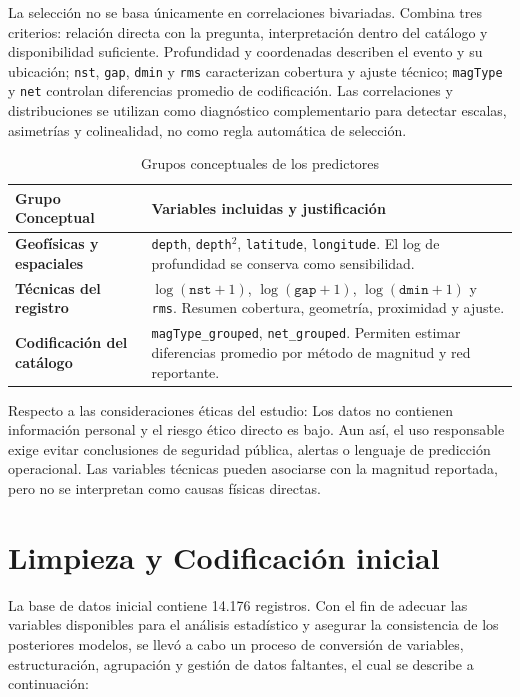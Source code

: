 \documentclass{style}
\newcommand{\var}[1]{\texttt{#1}}
\begin{document}
La selección no se basa únicamente en correlaciones bivariadas. Combina tres criterios: relación directa con la pregunta, interpretación dentro del catálogo y disponibilidad suficiente. Profundidad y coordenadas describen el evento y su ubicación; \var{nst}, \var{gap}, \var{dmin} y \var{rms} caracterizan cobertura y ajuste técnico; \var{magType} y \var{net} controlan diferencias promedio de codificación. Las correlaciones y distribuciones se utilizan como diagnóstico complementario para detectar escalas, asimetrías y colinealidad, no como regla automática de selección.

\begin{table}[H]
    \centering
    \caption{Grupos conceptuales de los predictores}
    \label{tab:grupos_predictores}
    \scriptsize
    \begin{tabularx}{\textwidth}{lX}
    \toprule
    \textbf{Grupo Conceptual} & \textbf{Variables incluidas y justificación} \\
    \midrule
    \textbf{Geofísicas y espaciales} & \var{depth}, \var{depth}$^2$, \var{latitude}, \var{longitude}. El log de profundidad se conserva como sensibilidad. \\
    \textbf{Técnicas del registro} & $\log(\var{nst}+1)$, $\log(\var{gap}+1)$, $\log(\var{dmin}+1)$ y \var{rms}. Resumen cobertura, geometría, proximidad y ajuste. \\
    \textbf{Codificación del catálogo} & \var{magType\_grouped}, \var{net\_grouped}. Permiten estimar diferencias promedio por método de magnitud y red reportante. \\
    \bottomrule
    \end{tabularx}
\end{table}


Respecto a las consideraciones éticas del estudio: Los datos no contienen información personal y el riesgo ético directo es bajo. Aun así, el uso responsable exige evitar conclusiones de seguridad pública, alertas o lenguaje de predicción operacional. Las variables técnicas pueden asociarse con la magnitud reportada, pero no se interpretan como causas físicas directas.

\section{Limpieza y Codificación inicial }

La base de datos inicial contiene 14.176 registros. Con el fin de adecuar las variables disponibles para el análisis estadístico y asegurar la consistencia de los posteriores modelos, se llevó a cabo un proceso de conversión de variables, estructuración, agrupación y gestión de datos faltantes, el cual se describe a continuación:
\end{document}
